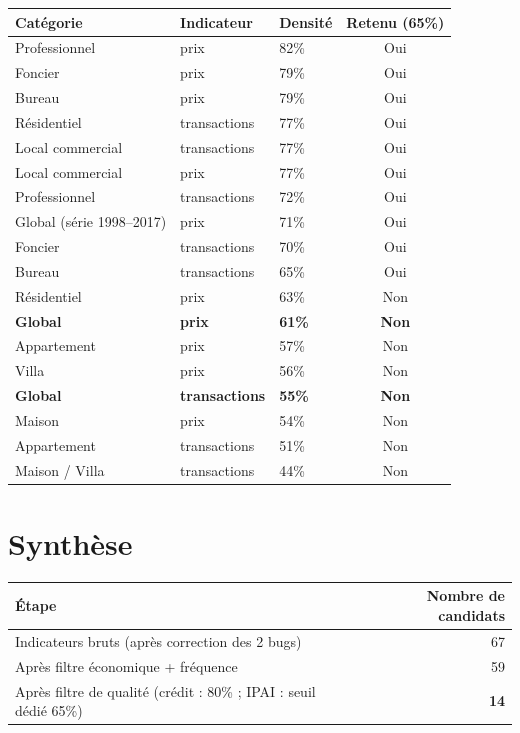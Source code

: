 \documentclass[11pt,a4paper]{article}
\begin{document}
\begin{center}
\small
\begin{tabular}{p{4.5cm}p{2cm}p{2cm}c}
\toprule
\textbf{Catégorie} & \textbf{Indicateur} & \textbf{Densité} & \textbf{Retenu (65\%)} \\
\midrule
Professionnel & prix & 82\% & Oui \\
Foncier & prix & 79\% & Oui \\
Bureau & prix & 79\% & Oui \\
Résidentiel & transactions & 77\% & Oui \\
Local commercial & transactions & 77\% & Oui \\
Local commercial & prix & 77\% & Oui \\
Professionnel & transactions & 72\% & Oui \\
Global (série 1998--2017) & prix & 71\% & Oui \\
Foncier & transactions & 70\% & Oui \\
Bureau & transactions & 65\% & Oui \\
\midrule
Résidentiel & prix & 63\% & Non \\
\textbf{Global} & \textbf{prix} & \textbf{61\%} & \textbf{Non} \\
Appartement & prix & 57\% & Non \\
Villa & prix & 56\% & Non \\
\textbf{Global} & \textbf{transactions} & \textbf{55\%} & \textbf{Non} \\
Maison & prix & 54\% & Non \\
Appartement & transactions & 51\% & Non \\
Maison / Villa & transactions & 44\% & Non \\
\bottomrule
\end{tabular}
\end{center}

\section{Synthèse}

\begin{fichebox}
\begin{center}
\begin{tabular}{lr}
\toprule
\textbf{Étape} & \textbf{Nombre de candidats} \\
\midrule
Indicateurs bruts (après correction des 2 bugs) & 67 \\
Après filtre économique + fréquence & 59 \\
Après filtre de qualité (crédit : 80\% ; IPAI : seuil dédié 65\%) & \textbf{14} \\
\bottomrule
\end{tabular}
\end{center}
\end{fichebox}
\end{document}
